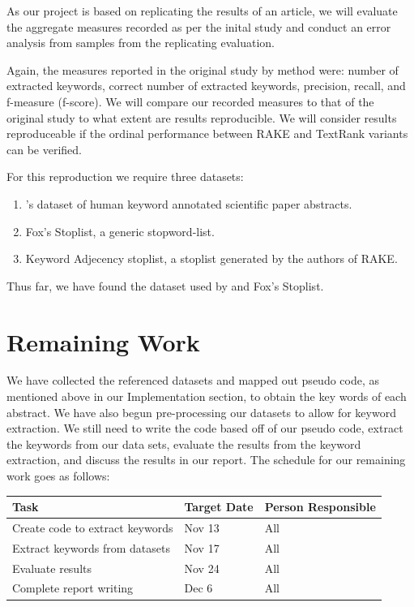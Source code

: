 \documentclass[11pt,a4paper]{article}
\begin{document}
As our project is based on replicating the results of an article, we will evaluate the aggregate measures recorded as per the inital study and conduct an error analysis from samples from the replicating evaluation. 

Again, the measures reported in the original study by method were: number of extracted keywords, correct number of extracted keywords, precision, recall, and f-measure (f-score).  We will compare our recorded measures to that of the original study to what extent are  results reproducible. We will consider  results reproduceable if the ordinal performance between RAKE and TextRank variants can be verified. 

For this reproduction we require three datasets:

\begin{enumerate}
\item \citet{hulth-2003-improved}'s dataset of human keyword annotated scientific paper abstracts.
\item Fox's Stoplist, a generic stopword-list. 
\item Keyword Adjecency stoplist, a stoplist generated by the authors of RAKE.
\end{enumerate}   

Thus far, we have found the dataset used by \citet{hulth-2003-improved} and Fox's Stoplist.

\section{Remaining Work}

We have collected the referenced datasets and mapped out pseudo code, as mentioned above in our Implementation section, to obtain the key words of each abstract. We have also begun pre-processing our datasets to allow for keyword extraction. We still need to write the code based off of our pseudo code, extract the keywords from our data sets, evaluate the results from the keyword extraction, and discuss the results in our report. The schedule for our remaining work goes as follows:

\begin{table}[h]
\begin{center}
\begin{tabular}{|p{3.3cm}|p{1.4cm}|p{1.7cm}|}
\hline \bf Task & \bf Target Date & \bf Person  Responsible \\  
\hline
 Create code to extract keywords & Nov 13 & All \\ 
\hline 
 Extract keywords from datasets & Nov 17 & All \\
\hline
 Evaluate results & Nov 24 & All \\
\hline
Complete report writing & Dec 6 & All  \\
\hline   
\end{tabular}
\end{center}
\end{table}
\end{document}
